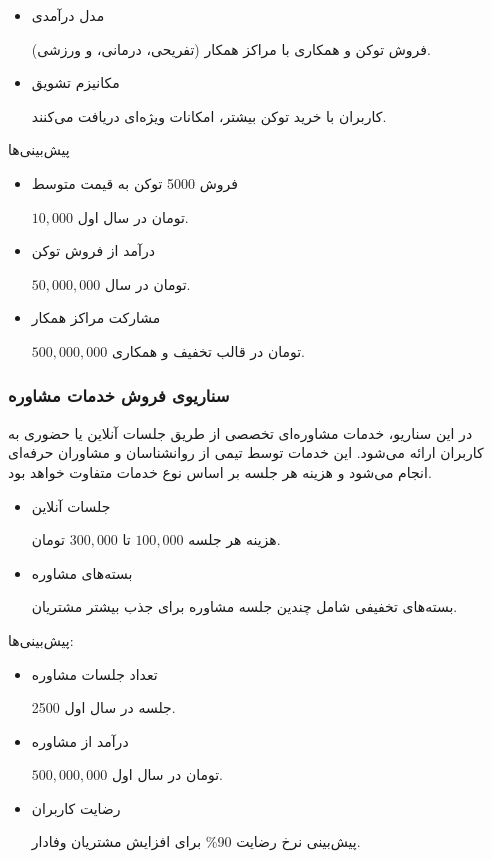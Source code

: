 \documentclass[dvipsnames, svgnames, x11names, 11pt]{article}
\begin{document}
\begin{itemize}
\item
مدل درآمدی

فروش توکن و همکاری با مراکز همکار (تفریحی، درمانی، و ورزشی).

\item
مکانیزم تشویق

کاربران با خرید توکن بیشتر، امکانات ویژه‌ای دریافت می‌کنند.
\end{itemize}
پیش‌بینی‌ها

\begin{itemize}
\item 
 فروش 5000 توکن به قیمت متوسط

$10,000$
تومان در سال اول.
\item 
درآمد از فروش توکن

$50,000,000$
تومان در سال.
\item 
مشارکت مراکز همکار

$500,000,000$
تومان در قالب تخفیف و همکاری.
\end{itemize}


\subsubsection{سناریوی فروش خدمات مشاوره }
در این سناریو، خدمات مشاوره‌ای تخصصی از طریق جلسات آنلاین یا حضوری به کاربران ارائه می‌شود. این خدمات توسط تیمی از روانشناسان و مشاوران حرفه‌ای انجام می‌شود و هزینه هر جلسه بر اساس نوع خدمات متفاوت خواهد بود.
\begin{itemize}
\item
جلسات آنلاین

هزینه هر جلسه
$100,000$
تا
$300,000$
تومان.

\item
بسته‌های مشاوره

بسته‌های تخفیفی شامل چندین جلسه مشاوره برای جذب بیشتر مشتریان.
\end{itemize}

پیش‌بینی‌ها:
\begin{itemize}
\item
تعداد جلسات مشاوره

2500 جلسه در سال اول.

\item
درآمد از مشاوره

$500,000,000$
تومان در سال اول.

\item
رضایت کاربران 

پیش‌بینی نرخ رضایت 90\% برای افزایش مشتریان وفادار.
\end{itemize}
\end{document}
